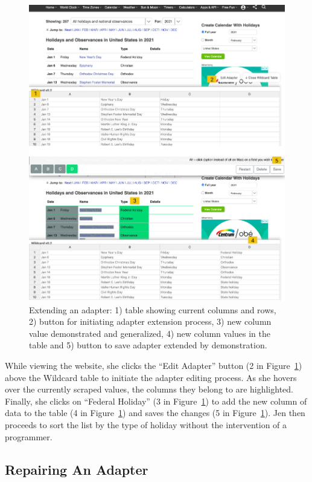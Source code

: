 \documentclass[sigconf,10pt]{acmart}
\begin{document}
\begin{figure}
  \includegraphics[width=\textwidth]{media/extending.png}
  \caption{\label{fig:extending} Extending an adapter: 1) table showing current columns and rows, 2) button for initiating adapter extension process, 3) new column value demonstrated and generalized, 4) new column values in the table and 5) button to save adapter extended by demonstration.}
\end{figure}

While viewing the website, she clicks the ``Edit Adapter'' button (2 in
Figure~\ref{fig:extending}) above the Wildcard table to initiate the
adapter editing process. As she hovers over the currently scraped
values, the columns they belong to are highlighted. Finally, she clicks
on ``Federal Holiday'' (3 in Figure~\ref{fig:extending}) to add the new
column of data to the table (4 in Figure~\ref{fig:extending}) and saves
the changes (5 in Figure~\ref{fig:extending}). Jen then proceeds to sort
the list by the type of holiday without the intervention of a
programmer.

\hypertarget{repairing-an-adapter}{%
\subsection{Repairing An Adapter}\label{repairing-an-adapter}}
\end{document}
